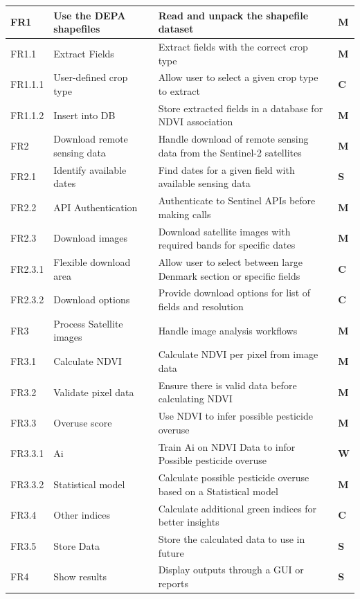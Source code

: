 \begin{longtable}{|p{1.2cm}|p{4cm}|p{6cm}|p{1.2cm}|}
\hline
FR1 & Use the DEPA shapefiles & Read and unpack the shapefile dataset &\textbf{M}\\
\hline
FR1.1 & Extract Fields & Extract fields with the correct crop type & \textbf{M} \\
\hline
FR1.1.1 & User-defined crop type & Allow user to select a given crop type to extract & \textbf{C} \\
\hline
FR1.1.2 & Insert into DB & Store extracted fields in a database for NDVI association & \textbf{M} \\
\hline
FR2 & Download remote sensing data & Handle download of remote sensing data from the Sentinel-2 satellites & \textbf{M}\\
\hline
FR2.1 & Identify available dates & Find dates for a given field with available sensing data & \textbf{S} \\
\hline
FR2.2 & API Authentication & Authenticate to Sentinel APIs before making calls & \textbf{M} \\
\hline
FR2.3 & Download images & Download satellite images with required bands for specific dates & \textbf{M} \\
\hline
FR2.3.1 & Flexible download area & Allow user to select between large Denmark section or specific fields & \textbf{C} \\
\hline
FR2.3.2 & Download options & Provide download options for list of fields and resolution &\textbf{C} \\
\hline
FR3 & Process Satellite images & Handle image analysis workflows &\textbf{M} \\
\hline
FR3.1 & Calculate NDVI & Calculate NDVI per pixel from image data &\textbf{M} \\
\hline
FR3.2 & Validate pixel data & Ensure there is valid data before calculating NDVI &\textbf{M} \\
\hline
FR3.3 & Overuse score & Use NDVI to infer possible pesticide overuse & \textbf{M} \\
\hline
FR3.3.1 & Ai & Train Ai on NDVI Data to infor Possible pesticide overuse & \textbf{W}\\
\hline
FR3.3.2 & Statistical model & Calculate possible pesticide overuse based on a Statistical model & \textbf{M} \\
\hline
FR3.4 & Other indices & Calculate additional green indices for better insights & \textbf{C} \\
\hline
FR3.5 & Store Data & Store the calculated data to use in future & \textbf{S} \\
\hline
FR4 & Show results & Display outputs through a GUI or reports & \textbf{S} \\

\end{longtable}

